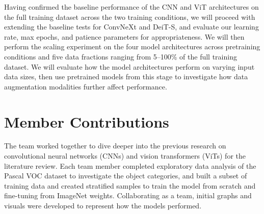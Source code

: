 \documentclass{article}
\begin{document}
Having confirmed the baseline performance of the CNN and ViT architectures on the full training dataset across the two training conditions, we will proceed with extending the baseline tests for ConvNeXt and DeiT-S, and evaluate our learning rate, max epochs, and patience parameters for appropriateness. We will then perform the scaling experiment on the four model architectures across pretraining conditions and five data fractions ranging from 5--100\% of the full training dataset. We will evaluate how the model architectures perform on varying input data sizes, then use pretrained models from this stage to investigate how data augmentation modalities further affect performance.


\section{Member Contributions}

The team worked together to dive deeper into the previous research on convolutional neural networks (CNNs) and vision transformers (ViTs) for the literature review. Each team member completed exploratory data analysis of the Pascal VOC dataset to investigate the object categories, and built a subset of training data and created stratified samples to train the model from scratch and fine-tuning from ImageNet weights. Collaborating as a team, initial graphs and visuals were developed to represent how the models performed.


\end{document}
